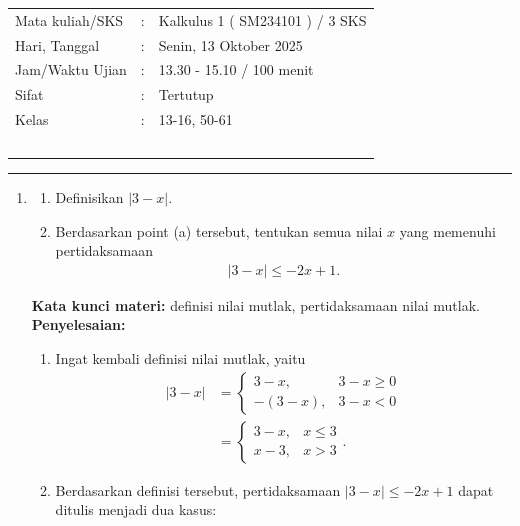 \documentclass[10pt,openany,a4paper]{article}
\theoremstyle{definition}
\theoremstyle{definition}
\theoremstyle{plain}
\newenvironment{jawab}[2][tes]{
\textbf{Kata kunci materi:} #1.\\
\textbf{Penyelesaian:} #2
}{}
\begin{document}
    \begin{center}
	\begin{tabular}{lcl}
		Mata kuliah/SKS & : & Kalkulus 1 ( SM234101 ) / 3 SKS\\
		Hari, Tanggal & : & Senin, 13 Oktober 2025\\
		Jam/Waktu Ujian & : & 13.30 - 15.10 / 100 menit\\
		Sifat & : & Tertutup\\
		Kelas & : & 13-16, 50-61\\
  ~
	\end{tabular}
    
    \noindent\rule{\textwidth}{2.pt}
        \end{center}
        \begin{enumerate}
            \item \begin{enumerate}
                \item Definisikan $|3-x|$.
                \item Berdasarkan point (a) tersebut, tentukan semua nilai $x$ yang memenuhi pertidaksamaan 
                \begin{align*}
                    |3-x|\leq -2x+1.
                \end{align*}
            \end{enumerate}
            \begin{jawab}[definisi nilai mutlak, pertidaksamaan nilai mutlak]{
                \begin{enumerate}
                    \item Ingat kembali definisi nilai mutlak, yaitu
                    \begin{align*}
                        |3-x| &= \begin{cases}
                            3-x, & 3-x \geq 0\\
                            -(3-x), & 3-x < 0
                        \end{cases} \\
                        &= \begin{cases}
                            3-x, & x\leq 3\\
                            x-3, & x>3
                        \end{cases}.
                    \end{align*}
                    \item Berdasarkan definisi tersebut, pertidaksamaan $|3-x|\leq -2x+1$ dapat ditulis menjadi dua kasus:

\end{enumerate}}
\end{jawab}
\end{enumerate}
\end{document}
